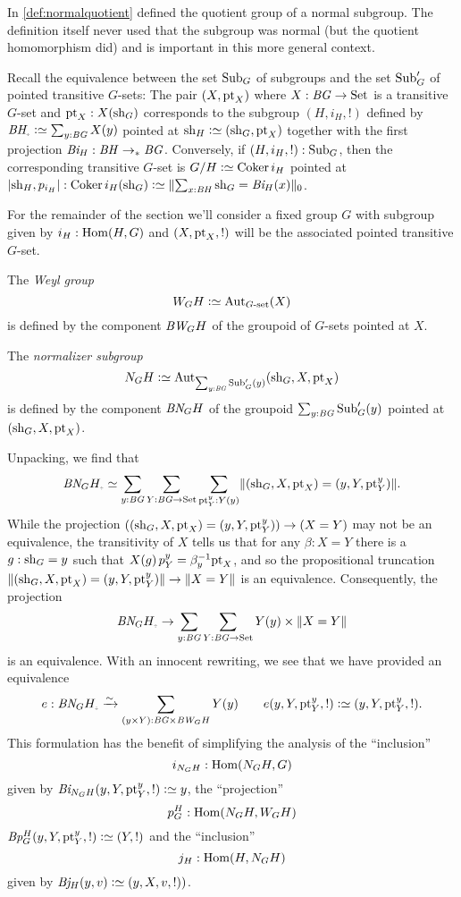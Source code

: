 \label{sec:Weyl}

In \cref{def:normalquotient} defined the quotient group of a normal subgroup.  The definition itself never used that the subgroup was normal (but the quotient homomorphism did) and is important in this more general context.

Recall the equivalence between the set $\mathrm{Sub}_G$ of subgroups and the set $\mathrm{Sub}_G'$ of pointed transitive $G$-sets: The pair $(X,\mathrm{pt}_X)$ where $X:\mathit{B}\mathit{G}\to\mathrm{Set}$ is a transitive $G$-set and $\mathrm{pt}_X:X(\mathrm{sh}_G)$ corresponds to the subgroup $(H,i_H,!)$ defined by  $\BH_\div\defequi\sum_{y:\BG}X(y)$ pointed at $\sh_H\defequi (\sh_G,\pt_X)$ together with the first projection $\mathit{B}\mathit{i}_H:\mathit{B}\mathit{H}\to_*\mathit{B}\mathit{G}$.  Conversely, if $(H,i_H,!):\mathrm{Sub}_G$, then the corresponding transitive $G$-set is $G/H\defequi\coker i_H$ pointed at $|\sh_H,p_{i_H}|:\coker i_H(\sh_G)\defequi\Trunc{\sum_{x:\BH}\sh_G=\Bi_H(x)}_0$.  

For the remainder of the section we'll consider a fixed group $G$ with subgroup given by $i_H:\Hom(H,G)$ and $(X,\mathrm{pt}_X,!)$ will be the associated pointed transitive $G$-set.

\begin{definition}
  
The \emph{Weyl group} \label{def:Weyl}
$$W_GH\defequi\Aut_{G\text{-set}}(X)$$ is defined by the component $\mathit{B}\mathit{W}_GH$ of the groupoid of $G$-sets pointed at $X$.

The \emph{normalizer subgroup} \label{def:normalizer}
$$N_GH\defequi\Aut_{\sum_{y:\BG}\typesubgroup_G'(y)}(\sh_G,X,\pt_X)$$ is defined by the component $\mathit{B}\mathit{N}_GH$ of the groupoid $\sum_{y:\mathit{B}\mathit{G}}\mathrm{Sub}_G'(y)$ pointed at $(\mathrm{sh}_G,X,\mathrm{pt}_X)$.
\end{definition}

Unpacking, we find that
$$\BN_GH_\div\oldequiv \sum_{y:\BG}\sum_{Y:\BG\to\Set}\sum_{\pt^y_Y:Y(y)} \Trunc{(\sh_G,X,\pt_X)=(y,Y,\pt^y_Y)}.$$
While the projection $((\mathrm{sh}_G,X,\mathrm{pt}_X)=(y,Y,\mathrm{pt}^y_Y))\to (X=Y)$ may not be an equivalence, the transitivity of $X$ tells us that for any $\beta:X=Y$ there is a $g:\mathrm{sh}_G=y$ such that $X(g)\,p^y_Y=\beta^{-1}_y\mathrm{pt}_X$, and so the propositional truncation $\lVert(\mathrm{sh}_G,X,\mathrm{pt}_X)=(y,Y,\mathrm{pt}^y_Y)\rVert \to \lVert X=Y\rVert$ is an equivalence.
Consequently, the projection
$$\BN_GH_\div\to \sum_{y:\BG}\sum_{Y:\BG\to\Set}Y(y)\times\Trunc{X=Y}$$
is an equivalence.  With an innocent rewriting, we see that we have provided an equivalence 
$$e:\BN_GH_\div\we\sum_{(y\times Y):\BG\times \BW_GH}Y(y)\qquad e(y,Y,\pt^y_Y,!)\defequi (y,Y,\pt^y_Y,!).$$
This formulation has the benefit of simplifying the analysis of the ``inclusion'' 
$$i_{N_GH}:\Hom(N_GH,G)$$
given by $\Bi_{N_GH}(y,Y,\pt^y_Y,!)\defequi y$, the ``projection''
 $$p_G^H:\Hom(N_GH,W_GH)$$
$\Bp_G^H(y,Y,\pt^y_Y,!)\defequi (Y,!)$ and the ``inclusion''
$$j_H:\Hom(H,N_GH)$$
given by $\Bj_H(y,v)\defequi(y,X,v,!))$.


